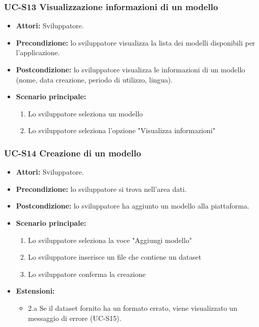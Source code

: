 	\subsubsection{UC-S13 Visualizzazione informazioni di un modello}
		\begin{itemize}
			\item \textbf{Attori:} Sviluppatore.
			\item \textbf{Precondizione:} lo sviluppatore visualizza la lista dei modelli disponibili per l'applicazione.
			\item \textbf{Postcondizione:} lo sviluppatore visualizza le informazioni di un modello (nome, data creazione, periodo di utilizzo, lingua).
			\item \textbf{Scenario principale:}
			\begin{enumerate}
				\item Lo sviluppatore seleziona un modello
				\item Lo sviluppatore seleziona l'opzione "Visualizza informazioni"
				\end{enumerate}
		\end{itemize}
		
	\subsubsection{UC-S14 Creazione di un modello}		
		\begin{itemize}
			\item \textbf{Attori:} Sviluppatore.
			\item \textbf{Precondizione:} lo sviluppatore si trova nell'area dati.
			\item \textbf{Postcondizione:} lo sviluppatore ha aggiunto un modello alla piattaforma.
			\item \textbf{Scenario principale:}
			\begin{enumerate}
				\item Lo sviluppatore seleziona la voce "Aggiungi modello"
				\item Lo sviluppatore inserisce un file che contiene un dataset
				\item Lo sviluppatore conferma la creazione
			\end{enumerate}
			\item \textbf{Estensioni:}
				\begin{itemize}
					\item 2.a Se il dataset fornito ha un formato errato, viene visualizzato un messaggio di errore (UC-S15).
				\end{itemize}
		\end{itemize}
		
